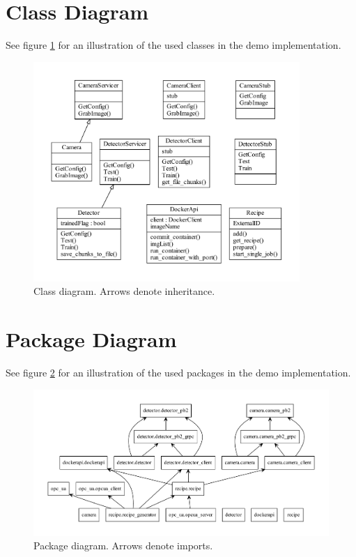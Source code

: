 \section{Class Diagram}
See figure \ref{fig:Classes} for an illustration of the used classes in the demo implementation.
\begin{figure}[h]
	\centering
  \includegraphics[width=0.9\textwidth]{img/classes.pdf}
	\caption[Class diagram]{Class diagram. Arrows denote inheritance.}
	\label{fig:Classes}
\end{figure}

\section{Package Diagram}
See figure \ref{fig:Packages} for an illustration of the used packages in the demo implementation.
\begin{figure}[h]
	\centering
  \includegraphics[width=\textwidth]{img/packages.pdf}
	\caption[Package diagram]{Package diagram. Arrows denote imports.}
	\label{fig:Packages}
\end{figure}

